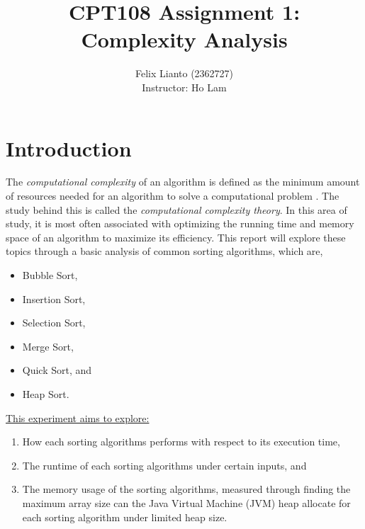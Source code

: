 \documentclass{report}
\begin{document}
	\title{\textbf{CPT108 Assignment 1:}\\Complexity Analysis}
	\author{Felix Lianto (2362727)\\
			[1cm]{Instructor: Ho Lam}}
	\maketitle
	
\section{Introduction}
The \textit{computational complexity} of an algorithm is defined as the minimum amount of resources needed for an algorithm to solve a computational problem \autocite{vadhanComputationalComplexity2011}. The study behind this is called the \textit{computational complexity theory}. In this area of study, it is most often associated with optimizing the running time and memory space of an algorithm to maximize its efficiency. This report will explore these topics through a basic analysis of common sorting algorithms, which are, 
\begin{itemize}
	\itemsep 0.25pt
	\item Bubble Sort,
	\item Insertion Sort,
	\item Selection Sort,
	\item Merge Sort,
	\item Quick Sort, and
	\item Heap Sort.
\end{itemize}

\underline{This experiment aims to explore:}
\begin{enumerate}
	\item How each sorting algorithms performs with respect to its execution time,
	\item The runtime of each sorting algorithms under certain inputs, and
	\item The memory usage of the sorting algorithms, measured through finding the maximum array size can the Java Virtual Machine (JVM) heap allocate for each sorting algorithm under limited heap size. 
\end{enumerate}
\end{document}
